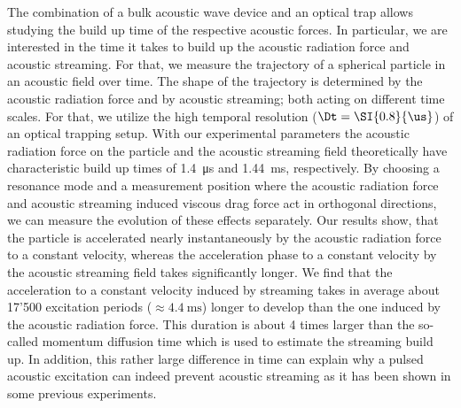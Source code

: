 The combination of a bulk acoustic wave device and an optical trap allows 
studying the build up time of the respective acoustic forces. In particular, we 
are interested in the time it takes to build up the acoustic radiation force 
and acoustic streaming. For that, we measure the trajectory of a spherical 
particle in an acoustic field over time. The shape of the trajectory is 
determined by the acoustic radiation force and by acoustic streaming; both 
acting on different time scales. For that, we utilize the high temporal 
resolution ($\Dt = \SI{0.8}{\us}$) of an optical trapping setup. With our 
experimental parameters the acoustic radiation force on the particle and the 
acoustic streaming field theoretically have characteristic build up times of 
\SI{1.4}{\us} and \SI{1.44}{\ms}, respectively. By choosing a resonance mode 
and a measurement position where the acoustic radiation force and acoustic 
streaming induced viscous drag force act in orthogonal directions, we can 
measure the evolution of these effects separately. Our results show, that the 
particle is accelerated nearly instantaneously by the acoustic radiation force 
to a constant velocity, whereas the acceleration phase to a constant velocity 
by the acoustic streaming field takes significantly longer. We find that the 
acceleration to a constant velocity induced by streaming takes in average about 
17'500 excitation periods ($\approx \SI{4.4}{\ms}$) longer to develop than the 
one induced by the acoustic radiation force. This duration is about 4 times 
larger than the so-called momentum diffusion time which is used to estimate the 
streaming build up. In addition, this rather large difference in time can 
explain why a pulsed acoustic excitation can indeed prevent acoustic streaming 
as it has been shown in some previous experiments.
